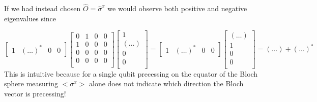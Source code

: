 If we had instead chosen  $\hat{O} = \hat{\sigma}^x$ we would observe both positive and negative eigenvalues since

\begin{equation}
    \begin{bmatrix}
        1 & (\ldots)^* & 0 & 0
    \end{bmatrix}
    \begin{bmatrix}
        0 & 1 & 0 & 0 \\
        1 & 0 & 0 & 0 \\
        0 & 0 & 0 & 0 \\
        0 & 0 & 0 & 0 \\
    \end{bmatrix}
    \begin{bmatrix}
        1 \\
        (\ldots) \\
        0 \\
        0 \\
    \end{bmatrix}
    =
    \begin{bmatrix}
        1 & (\ldots)^* & 0 & 0
    \end{bmatrix}
    \begin{bmatrix}
        (\ldots) \\
        1 \\
        0 \\
        0 \\
    \end{bmatrix}
    = (...) + (...)^*
\end{equation}
This is intuitive because for a single qubit precessing on the equator of the Bloch sphere measuring $<\sigma^x>$ alone does not indicate which direction the Bloch vector is precessing!

